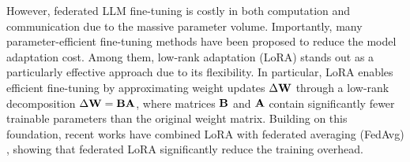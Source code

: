 \documentclass{article} %
\theoremstyle{plain}
\theoremstyle{definition}
\begin{document}
However, federated LLM fine-tuning is costly in both computation and communication due to the massive parameter volume.
Importantly, many parameter-efficient fine-tuning methods have been proposed \citep{lester2021power, li2021prefix, hu2021lora} to reduce the model adaptation cost. 
Among them, low-rank adaptation (LoRA) \citep{hu2021lora} stands out as a particularly effective approach due to its flexibility. %
In particular, LoRA enables efficient fine-tuning by approximating weight updates \( \Delta {\bf W} \) through a low-rank decomposition \( \Delta {\bf W} = {\bf BA} \), where matrices \( {\bf B} \) and \( {\bf A} \) contain significantly fewer trainable parameters than the original weight matrix. 
Building on this foundation, recent works have combined LoRA with federated averaging (FedAvg) \citep{zhang2024towards,ye2024openfedllm}, showing that federated LoRA significantly reduce the training overhead.
\end{document}
